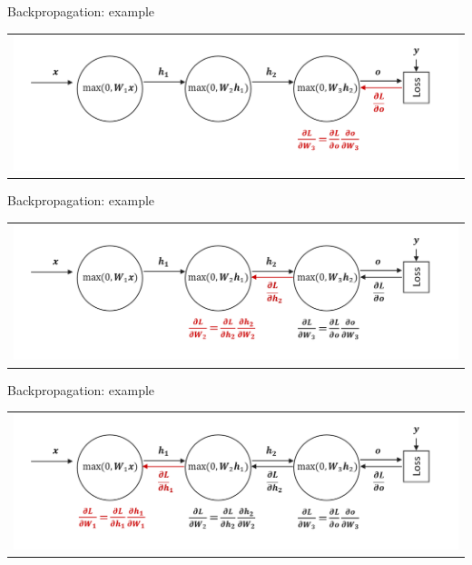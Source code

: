 \documentclass[aspectratio=169]{beamer}
\begin{document}

\begin{frame}{Backpropagation: example}
\begin{tabular}{c}
\includegraphics[width=1.\textwidth]{img/dnn/backprop/backprop_6.png}
\end{tabular}	
\end{frame}


\begin{frame}{Backpropagation: example}
\begin{tabular}{c}
\includegraphics[width=1.\textwidth]{img/dnn/backprop/backprop_7.png}
\end{tabular}	
\end{frame}


\begin{frame}{Backpropagation: example}
\begin{tabular}{c}
\includegraphics[width=1.\textwidth]{img/dnn/backprop/backprop_8.png}
\end{tabular}	
\end{frame}
\end{document}

